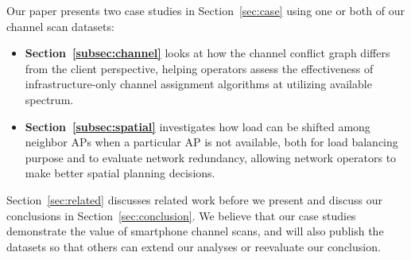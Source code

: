 Our paper presents two case studies in Section~\ref{sec:case} using one or
both of our channel scan datasets:

\begin{itemize}
  \item \textbf{Section~\ref{subsec:channel}} looks at how the channel conflict
    graph differs from the client perspective, helping operators assess the
    effectiveness of infrastructure-only channel assignment algorithms at
    utilizing available spectrum.

  \item \textbf{Section~\ref{subsec:spatial}} investigates how load can be
    shifted among neighbor APs when a particular AP is not available, both for
    load balancing purpose and to evaluate network redundancy, allowing network
    operators to make better spatial planning decisions.
\end{itemize}

Section~\ref{sec:related} discusses related work before we present and
discuss our conclusions in Section~\ref{sec:conclusion}. We believe that our
case studies demonstrate the value of smartphone channel scans, and will
also publish the datasets so that others can extend our analyses or reevaluate
our conclusion.
